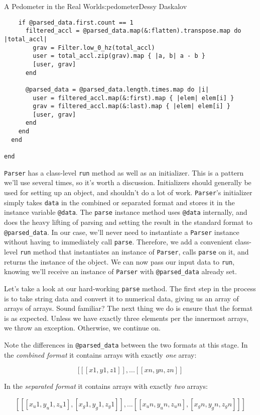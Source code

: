 \begin{aosachapter}{A Pedometer in the Real World}{s:pedometer}{Dessy Daskalov}
\begin{verbatim}
    if @parsed_data.first.count == 1
      filtered_accl = @parsed_data.map(&:flatten).transpose.map do |total_accl|
        grav = Filter.low_0_hz(total_accl)
        user = total_accl.zip(grav).map { |a, b| a - b }
        [user, grav]
      end

      @parsed_data = @parsed_data.length.times.map do |i|
        user = filtered_accl.map(&:first).map { |elem| elem[i] }
        grav = filtered_accl.map(&:last).map { |elem| elem[i] }
        [user, grav]
      end
    end
  end

end
\end{verbatim}

\texttt{Parser} has a class-level \texttt{run} method as well as an
initializer. This is a pattern we'll use several times, so it's worth a
discussion. Initializers should generally be used for setting up an
object, and shouldn't do a lot of work. \texttt{Parser}'s initializer
simply takes \texttt{data} in the combined or separated format and
stores it in the instance variable \texttt{@data}. The \texttt{parse}
instance method uses \texttt{@data} internally, and does the heavy
lifting of parsing and setting the result in the standard format to
\texttt{@parsed\_data}. In our case, we'll never need to instantiate a
\texttt{Parser} instance without having to immediately call
\texttt{parse}. Therefore, we add a convenient class-level \texttt{run}
method that instantiates an instance of \texttt{Parser}, calls
\texttt{parse} on it, and returns the instance of the object. We can now
pass our input data to \texttt{run}, knowing we'll receive an instance
of \texttt{Parser} with \texttt{@parsed\_data} already set.

Let's take a look at our hard-working \texttt{parse} method. The first
step in the process is to take string data and convert it to numerical
data, giving us an array of arrays of arrays. Sound familiar? The next
thing we do is ensure that the format is as expected. Unless we have
exactly three elements per the innermost arrays, we throw an exception.
Otherwise, we continue on.

Note the differences in \texttt{@parsed\_data} between the two formats
at this stage. In the \emph{combined format} it contains arrays with
exactly \emph{one} array:

\[[[[x1, y1, z1]], ... [[xn, yn, zn]]\]

In the \emph{separated format} it contains arrays with exactly
\emph{two} arrays:

\[[[[x_{u}1,y_{u}1,z_{u}1], [x_{g}1,y_{g}1,z_{g}1]], ... [[x_{u}n,y_{u}n,z_{u}n], [x_{g}n,y_{g}n,z_{g}n]]]\]


\end{aosachapter}
